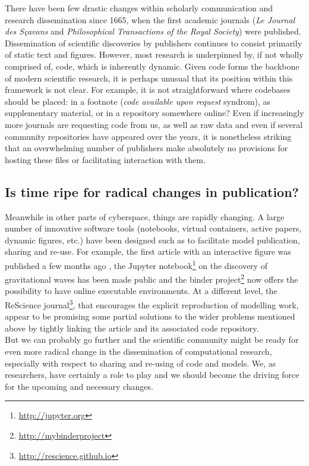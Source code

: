 \documentclass[jou]{apa6}
\begin{document}
There have been few drastic changes within scholarly communication and research dissemination since 1665, when the first academic journals (\textit{Le Journal des Sçavans} and \textit{Philosophical Transactions of the Royal Society}) were published.
Dissemination of scientific discoveries by publishers continues to consist primarily of static text and figures.
However, most research is underpinned by, if not wholly comprised of, code, which is inherently dynamic.
Given code forms the backbone of modern scientific research, it is perhaps unusual that its position within this framework is not clear.
For example, it is not straightforward where codebases should be placed: in a footnote ({\em code available upon request} syndrom), as supplementary material, or in a repository somewhere online?
Even if increasingly more journals are requesting code from us, as well as raw data and even if several community repositories have appeared over the years, it is nonetheless striking that an overwhelming number of publishers make absolutely no provisions for hosting these files or facilitating interaction with them.


\subsection*{Is time ripe for radical changes in publication?}

Meanwhile in other parts of cyberspace, things are rapidly changing.
A large number of innovative software tools (notebooks, virtual containers, active papers, dynamic figures, etc.) have been designed such as to facilitate model publication, sharing and re-use.
For example, the first article with an interactive figure was published a few months ago \cite{ogrean16}, the Jupyter notebook\footnote{\url{http://jupyter.org}} on the discovery of gravitational waves has been made public and the binder project\footnote{\url{http://mybinderproject}} now offers the possibility to have online executable environments.
At a different level, the ReScience journal\footnote{\url{http://rescience.github.io}},  that encourages the explicit reproduction of modelling work, appear to be promising some partial solutions to the wider problems mentioned above by tightly linking the article and its associated code repository.\\

But we can probably go further and the scientific community might be ready for even more radical change in the dissemination of computational research, especially with respect to sharing and re-using of code and models.
We, as researchers, have certainly a role to play and we should become the driving force for the upcoming and necessary changes.





\hspace*{1cm}
\end{document}
